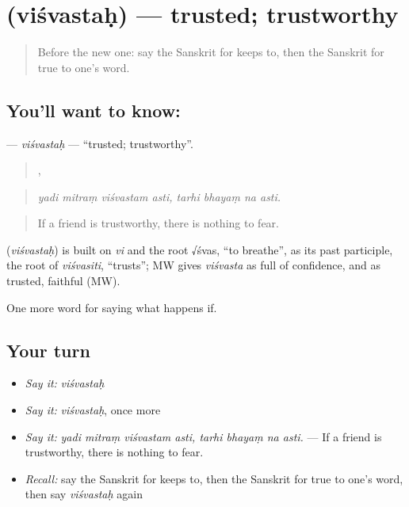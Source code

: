 \section[\texorpdfstring{\sk{विश्वस्तः} (viśvastaḥ)}{विश्वस्तः (viśvastaḥ)}]{ (viśvastaḥ) — trusted; trustworthy}

\label{lesson:SA-C535-visvastah}



\begin{quote}
Before the new one: say the Sanskrit for keeps to, then the Sanskrit for true to one's word.
\end{quote}

\subsection*{You'll want to know: }
\textbf{} — \emph{viśvastaḥ} — \textquotedblleft{}trusted; trustworthy\textquotedblright{}.

\begin{quote}
   ,    
\end{quote}

\begin{quote}
\emph{yadi mitraṃ viśvastam asti, tarhi bhayaṃ na asti.}
\end{quote}

\begin{quote}
If a friend is trustworthy, there is nothing to fear.
\end{quote}

\begin{cousinweb}
\textbf{} (\emph{viśvastaḥ}) is built on \emph{vi} and the root √śvas, \textquotedblleft{}to breathe\textquotedblright{}, as its past participle, the root of \emph{viśvasiti}, \textquotedblleft{}trusts\textquotedblright{}; MW gives \emph{viśvasta} as full of confidence, and as trusted, faithful (MW).
\end{cousinweb}

\begin{grammarlens}[title={What you've built}]
One more word for saying what happens if.
\end{grammarlens}

\subsection*{Your turn}
\begin{itemize}
\raggedright
  \item \emph{Say it:} \emph{viśvastaḥ}
  \item \emph{Say it:} \emph{viśvastaḥ}, once more
  \item \emph{Say it:} \emph{yadi mitraṃ viśvastam asti, tarhi bhayaṃ na asti.} — If a friend is trustworthy, there is nothing to fear.
  \item \emph{Recall:} say the Sanskrit for keeps to, then the Sanskrit for true to one's word, then say \emph{viśvastaḥ} again
\end{itemize}

